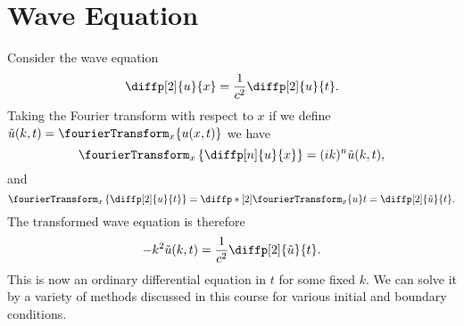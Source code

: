 \documentclass[fleqn]{NotesClass}
\begin{document}
    \section{Wave Equation}
    Consider the wave equation
    \begin{equation}
        \diffp[2]{u}{x} = \frac{1}{c^2} \diffp[2]{u}{t}.
    \end{equation}
    Taking the Fourier transform with respect to \(x\) if we define \(\tilde{u}(k, t) = \fourierTransform_x\{u(x, t)\}\) we have
    \begin{equation}
        \fourierTransform_{x}\left\{ \diffp[n]{u}{x} \right\} = (ik)^n\tilde{u}(k, t),
    \end{equation}
    and
    \begin{equation}
        \fourierTransform_{x}\left\{ \diffp[2]{u}{t} \right\} = \diffp*[2]{\fourierTransform_{x}\{u\}}{t} = \diffp[2]{\tilde{u}}{t}.
    \end{equation}
    The transformed wave equation is therefore
    \begin{equation}
        -k^2\tilde{u}(k, t) = \frac{1}{c^2}\diffp[2]{\tilde{u}}{t}.
    \end{equation}
    This is now an ordinary differential equation in \(t\) for some fixed \(k\).
    We can solve it by a variety of methods discussed in this course for various initial and boundary conditions.
    
    
    \backmatter
    \renewcommand{\glossaryname}{Acronyms}
    \printglossary[acronym]
    \printindex
\end{document}
